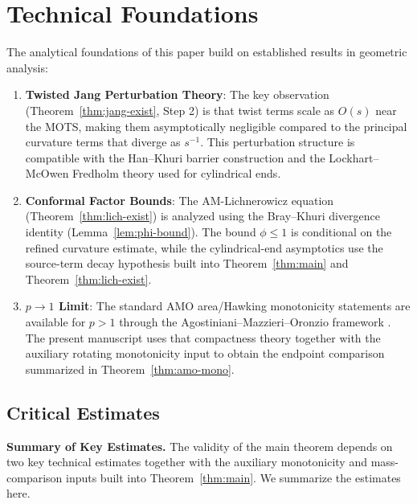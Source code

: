 \section{Technical Foundations}\label{app:technical}

The analytical foundations of this paper build on established results in geometric analysis:

\begin{enumerate}
    \item \textbf{Twisted Jang Perturbation Theory}: The key observation (Theorem~\ref{thm:jang-exist}, Step 2) is that twist terms scale as $O(s)$ near the MOTS, making them asymptotically negligible compared to the principal curvature terms that diverge as $s^{-1}$. This perturbation structure is compatible with the Han--Khuri barrier construction \cite{hankhuri2013} and the Lockhart--McOwen Fredholm theory \cite{lockhartmccowen1985} used for cylindrical ends.
    
    \item \textbf{Conformal Factor Bounds}: The AM-Lichnerowicz equation (Theorem~\ref{thm:lich-exist}) is analyzed using the Bray--Khuri divergence identity (Lemma~\ref{lem:phi-bound}). The bound $\phi \leq 1$ is conditional on the refined curvature estimate, while the cylindrical-end asymptotics use the source-term decay hypothesis built into Theorem~\ref{thm:main} and Theorem~\ref{thm:lich-exist}.
    
    \item \textbf{$p \to 1$ Limit}: The standard AMO area/Hawking monotonicity statements are available for $p > 1$ through the Agostiniani--Mazzieri--Oronzio framework \cite{amo2022}. The present manuscript uses that compactness theory together with the auxiliary rotating monotonicity input to obtain the endpoint comparison summarized in Theorem~\ref{thm:amo-mono}.
\end{enumerate}

\subsection{Critical Estimates}\label{subsec:critical-estimates-appendix}

\textbf{Summary of Key Estimates.} The validity of the main theorem depends on two key technical estimates together with the auxiliary monotonicity and mass-comparison inputs built into Theorem~\ref{thm:main}. We summarize the estimates here.

